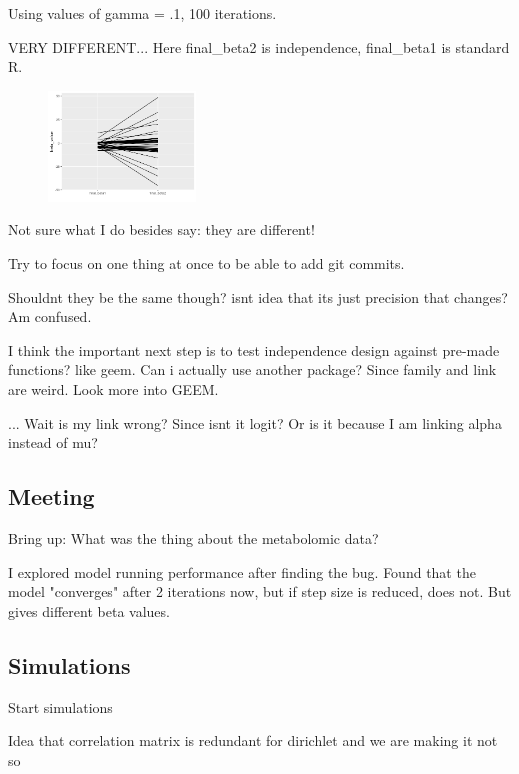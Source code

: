 \documentclass[10pt]{article}
\theoremstyle{definition}
\begin{document}
Using values of gamma = .1, 100 iterations.

VERY DIFFERENT...
Here final\_beta2 is independence, final\_beta1 is standard R.
\begin{figure}[!htb]
	\centering
	\includegraphics[width=0.35\textwidth]{img/Temp_week_journal-b398c6f5.png}
	\caption{}
	\label{}
\end{figure}

Not sure what I do besides say: they are different!

Try to focus on one thing at once to be able to add git commits.

Shouldnt they be the same though? isnt idea that its just precision that changes? Am confused.


I think the important next step is to test independence design against pre-made functions? like geem.
Can i actually use another package? Since family and link are weird. Look more into GEEM.

... Wait is my link wrong? Since isnt it logit? Or is it because I am linking alpha instead of mu?









\subsection{Meeting}
Bring up:
What was the thing about the metabolomic data?


I explored model running performance after finding the bug. Found that the model "converges" after 2 iterations now, but if step size is reduced, does not. But gives different beta values.


\subsection{Simulations}

Start simulations

Idea that correlation matrix is redundant for dirichlet and we are making it not so
\end{document}
